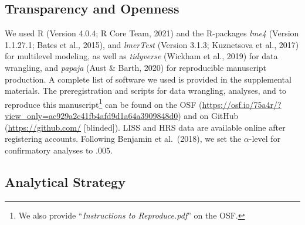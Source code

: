 \documentclass[
  english,
  man, noextraspace,floatsintext]{apa7}
\begin{document}
\hypertarget{transparency-and-openness}{%
\subsection{Transparency and Openness}\label{transparency-and-openness}}

We used R (Version 4.0.4; R Core Team, 2021) and the R-packages \emph{lme4} (Version 1.1.27.1; Bates et al., 2015), and \emph{lmerTest} (Version 3.1.3; Kuznetsova et al., 2017) for multilevel modeling, as well as \emph{tidyverse} (Wickham et al., 2019) for data wrangling, and \emph{papaja} (Aust \& Barth, 2020) for reproducible manuscript production. A complete list of software we used is provided in the supplemental materials. The preregistration and scripts for data wrangling, analyses, and to reproduce this manuscript\footnote{We also provide \enquote{\emph{Instructions to Reproduce.pdf}} on the OSF.} can be found on the OSF (\url{https://osf.io/75a4r/?view_only=ac929a2c41fb4afd9d1a64a3909848d0}) and on GitHub (\url{https://github.com/} {[}blinded{]}). LISS and HRS data are available online after registering accounts. Following Benjamin et al.~(2018), we set the \(\alpha\)-level for confirmatory analyses to \(.005\).

\hypertarget{analytical-strategy}{%
\subsection{Analytical Strategy}\label{analytical-strategy}}
\end{document}
